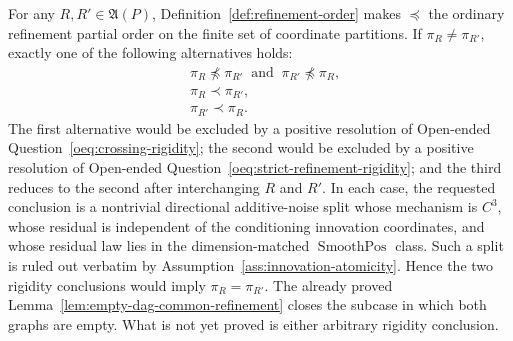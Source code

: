 For any \(R,R'\in\mathfrak A(P)\), Definition~\ref{def:refinement-order} makes \(\preceq\) the ordinary refinement partial order on the finite set of coordinate partitions.  If \(\pi_R\neq\pi_{R'}\), exactly one of the following alternatives holds:
\[
\begin{aligned}
&\pi_R\not\preceq\pi_{R'}\ \text{ and }\ \pi_{R'}\not\preceq\pi_R,\\
&\pi_R\prec\pi_{R'},\\
&\pi_{R'}\prec\pi_R.
\end{aligned}
\]
The first alternative would be excluded by a positive resolution of Open-ended Question~\ref{oeq:crossing-rigidity}; the second would be excluded by a positive resolution of Open-ended Question~\ref{oeq:strict-refinement-rigidity}; and the third reduces to the second after interchanging \(R\) and \(R'\).  In each case, the requested conclusion is a nontrivial directional additive-noise split whose mechanism is \(C^3\), whose residual is independent of the conditioning innovation coordinates, and whose residual law lies in the dimension-matched \(\operatorname{SmoothPos}\) class.  Such a split is ruled out verbatim by Assumption~\ref{ass:innovation-atomicity}.  Hence the two rigidity conclusions would imply \(\pi_R=\pi_{R'}\).  The already proved Lemma~\ref{lem:empty-dag-common-refinement} closes the subcase in which both graphs are empty.  What is not yet proved is either arbitrary rigidity conclusion.